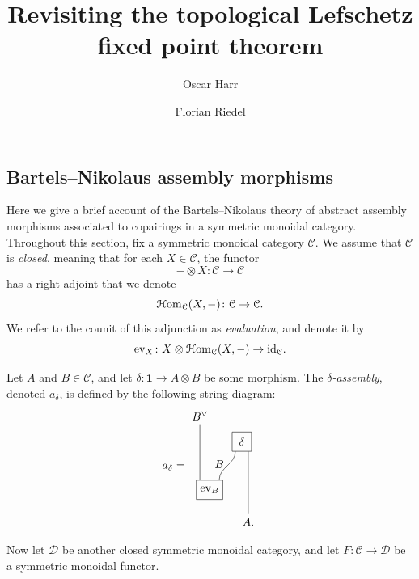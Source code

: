 \documentclass[english]{article}
\title{Revisiting the topological Lefschetz fixed point theorem}
\author{Oscar Harr \and Florian Riedel}
\numberwithin{equation}{section}
\begin{document}
\maketitle

\tableofcontents

\subsection{Bartels--Nikolaus assembly morphisms}
Here we give a brief account of the Bartels--Nikolaus theory of abstract assembly morphisms associated to copairings in a symmetric monoidal category. Throughout this section, fix a symmetric monoidal category $\mathcal C$. We assume that $\mathcal C$ is {\em closed}, meaning that for each $X\in\mathcal C$, the functor
$$
{-}\otimes X\colon\mathcal C\to\mathcal C
$$
has a right adjoint that we denote
$$
\operatorname{\mathcal{H}om}_{\mathcal C}(X,{-})\colon\mathcal C\to\mathcal C.
$$
We refer to the counit of this adjunction as {\em evaluation}, and denote it by
$$
\mathrm{ev}_X\colon X\otimes\operatorname{\mathcal{H}om}_{\mathcal C}(X,{-})\to\text{id}_{\mathcal C}.
$$
\begin{defn}
  Let $A$ and $B\in\mathcal C$, and let $\delta\colon\mathbf 1\to A\otimes B$ be some morphism. The {\em $\delta$-assembly}, denoted $a_{\delta}$, is defined by the following string diagram:
  \begin{equation*}
    \label{eq:assembly}
    a_\delta =
\begin{tikzpicture}[baseline=(current bounding box.center)]
  \node (Bvee) at (-0.3,3.3) {$B^\vee$};
  \node (deltabox) at (1,2.5) [rectangle, draw, minimum width=0.6cm, minimum height=0.6cm] {$\delta$};
  \node (evbox) at (0,1) [rectangle, draw, minimum width=0.6cm, minimum height=0.6cm] {$\mathrm{ev}_B$};
  \node (A) at (1.2,0) {$A$.};
  \node (B) at (0.3,1.8) {$B$};

  \draw (Bvee) -- (evbox.north -| -0.3,1.3);
  \draw (deltabox.south -| 0.8,2.5) to [out=270,in=90] (evbox.north -| 0.3,1.3);
  \draw (deltabox.south -| 1.2,2.5) -- (A);
  \end{tikzpicture}
\end{equation*}
\end{defn}
Now let $\mathcal D$ be another closed symmetric monoidal category, and let $F\colon\mathcal C\to\mathcal D$ be a symmetric monoidal functor.
\end{document}
